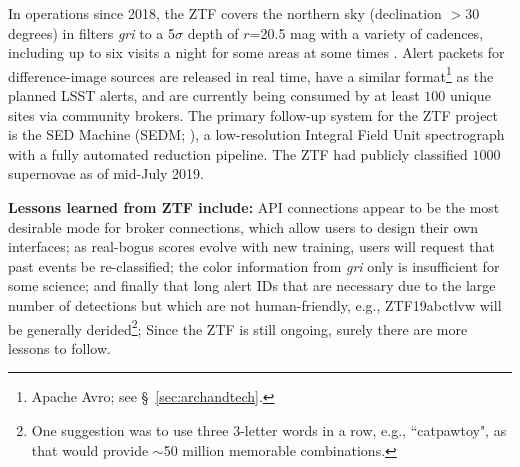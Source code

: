 In operations since 2018, the ZTF covers the northern sky (declination $>$30 degrees) in filters {\it gri} to a 5$\sigma$ depth of $r$=20.5 mag with a variety of cadences, including up to six visits a night for some areas at some times \citep{2019PASP..131f8003B,2019PASP..131g8001G}.
Alert packets for difference-image sources are released in real time, have a similar format\footnote{Apache Avro; see \S~\ref{sec:archandtech}.} as the planned LSST alerts, and are currently being consumed by at least $100$ unique sites via community brokers.
The primary follow-up system for the ZTF project is the SED Machine (SEDM; \citealt{2018PASP..130c5003B}), a low-resolution Integral Field Unit spectrograph with a fully automated reduction pipeline.
The ZTF had publicly classified $1000$ supernovae as of mid-July 2019. 

{\bf Lessons learned from ZTF include:}
API connections appear to be the most desirable mode for broker connections, which allow users to design their own interfaces;
as real-bogus scores evolve with new training, users will request that past events be re-classified;
the color information from {\it gri} only is insufficient for some science;
and finally that long alert IDs that are necessary due to the large number of detections but which are not human-friendly, e.g., ZTF19abctlvw will be generally derided\footnote{One suggestion was to use three 3-letter words in a row, e.g., ``catpawtoy", as that would provide $\sim$50 million memorable combinations.};
Since the ZTF is still ongoing, surely there are more lessons to follow.



